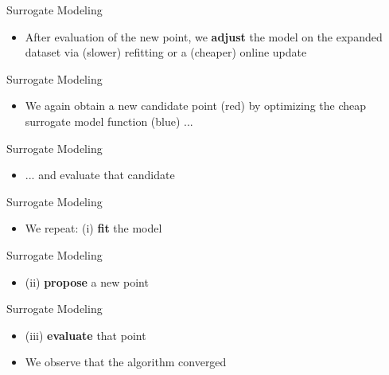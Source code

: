 \documentclass[11pt,compress,t,notes=noshow, xcolor=table]{beamer}
\begin{document}
\begin{framev}{Surrogate Modeling}
\begin{itemize}
\item After evaluation of the new point, we \textbf{adjust} the model on the expanded dataset via (slower) refitting or a (cheaper) online update
\end{itemize}
\vfill
{}
\end{framev}


\begin{framev}{Surrogate Modeling}
\begin{itemize}
\item We again obtain a new candidate point (red) by optimizing the cheap surrogate model function (blue) ...
\end{itemize}
\vfill
{}
\end{framev}


\begin{framev}{Surrogate Modeling}
\begin{itemize}
\item ... and evaluate that candidate
\end{itemize}
\vfill
{}
\end{framev}


\begin{framev}{Surrogate Modeling}
\begin{itemize}
\item We repeat: (i) \textbf{fit} the model
\end{itemize}
\vfill
{}
\end{framev}


\begin{framev}{Surrogate Modeling}
\begin{itemize}
\item (ii) \textbf{propose} a new point
\end{itemize}
\vfill
{}
\end{framev}


\begin{framev}{Surrogate Modeling}
\begin{itemize}
\item (iii) \textbf{evaluate} that point
\end{itemize}
\vfill
{}
\spacer
\begin{itemize}
\item We observe that the algorithm converged
\end{itemize}
\end{framev}
\end{document}
